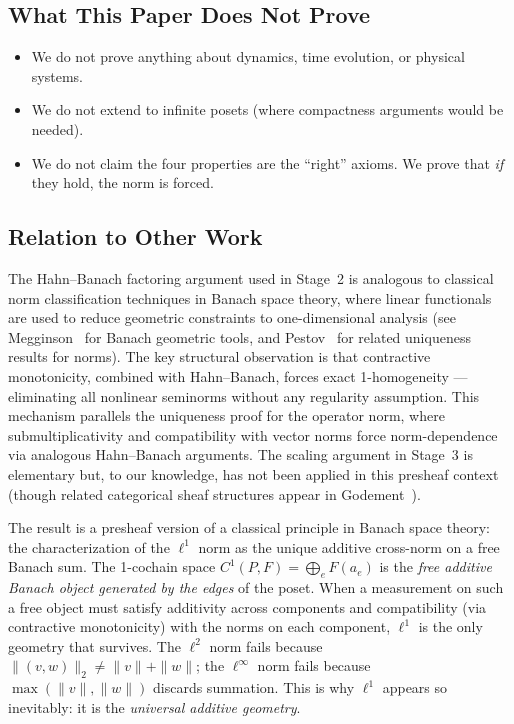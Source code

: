 \documentclass[11pt,a4paper]{amsart}
\theoremstyle{plain}
\theoremstyle{definition}
\begin{document}
\subsection{What This Paper Does Not Prove}

\begin{itemize}[nosep]
  \item We do not prove anything about dynamics, time evolution, or physical systems.
  \item We do not extend to infinite posets (where compactness arguments would be needed).
  \item We do not claim the four properties are the ``right'' axioms. We prove that \emph{if} they hold, the norm is forced.
\end{itemize}

\subsection{Relation to Other Work}

The Hahn--Banach factoring argument used in Stage~2 is analogous to classical norm classification techniques in Banach space theory, where linear functionals are used to reduce geometric constraints to one-dimensional analysis (see Megginson~\cite{megginson} for Banach geometric tools, and Pestov~\cite{pestov} for related uniqueness results for norms). The key structural observation is that contractive monotonicity, combined with Hahn--Banach, forces exact 1-homogeneity --- eliminating all nonlinear seminorms without any regularity assumption. This mechanism parallels the uniqueness proof for the operator norm, where submultiplicativity and compatibility with vector norms force norm-dependence via analogous Hahn--Banach arguments. The scaling argument in Stage~3 is elementary but, to our knowledge, has not been applied in this presheaf context (though related categorical sheaf structures appear in Godement~\cite{godement}).

The result is a presheaf version of a classical principle in Banach space theory: the characterization of the $\ell^1$ norm as the unique additive cross-norm on a free Banach sum. The 1-cochain space $C^1(P, F) = \bigoplus_e F(a_e)$ is the \emph{free additive Banach object generated by the edges} of the poset. When a measurement on such a free object must satisfy additivity across components and compatibility (via contractive monotonicity) with the norms on each component, $\ell^1$ is the only geometry that survives. The $\ell^2$ norm fails because $\|(v, w)\|_2 \neq \|v\| + \|w\|$; the $\ell^\infty$ norm fails because $\max(\|v\|, \|w\|)$ discards summation. This is why $\ell^1$ appears so inevitably: it is the \emph{universal additive geometry}.
\end{document}
